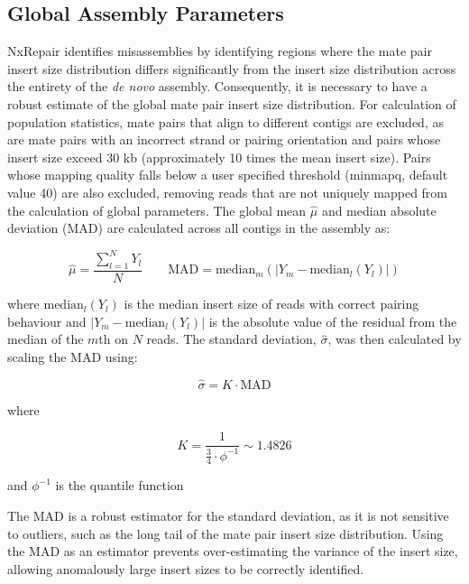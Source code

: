 \subsection{Global Assembly Parameters}
NxRepair identifies misassemblies by identifying regions where the mate pair insert size distribution differs significantly from the insert size distribution across the entirety of the \textit{de novo} assembly. Consequently, it is necessary to have a robust estimate of the global mate pair insert size distribution. For calculation of population statistics, mate pairs that align to different contigs are excluded, as are mate pairs with an incorrect strand or pairing orientation and pairs whose insert size exceed 30 kb (approximately 10 times the mean insert size). Pairs whose mapping quality falls below a user specified threshold (minmapq, default value 40) are also excluded, removing reads that are not uniquely mapped from the calculation of global parameters. The global mean $\hat{\mu}$ and median absolute deviation ($\text{MAD}$) are calculated across all contigs in the assembly as:

\begin{equation}
\hat{\mu} = \frac{\sum_{l=1}^N Y_l}{N} \qquad \text{MAD} = \text{median}_m(|Y_m - \text{median}_l(Y_l)|)
\label{eq:global}
\end{equation}

where $\text{median}_l(Y_l)$ is the median insert size of reads with correct pairing behaviour and $|Y_m - \text{median}_l(Y_l)|$ is the absolute value of the residual from the median of the $m$th on $N$ reads. The standard deviation, $\hat{\sigma}$, was then calculated by scaling the MAD using:

\begin{equation}
\hat{\sigma} = K \cdot \text{MAD}
\label{eq:mad_to_sigma}
\end{equation}

where 

\begin{equation}
K = \frac{1}{\frac{3}{4} \cdot \phi^{-1}} \sim 1.4826
\label{eq:k_scale}
\end{equation}

and $\phi^{-1}$ is the quantile function~\cite{Leys2013}

The $\text{MAD}$ is a robust estimator for the standard deviation, as it is not sensitive to outliers, such as the long tail of the mate pair insert size distribution. Using the MAD as an estimator prevents over-estimating the variance of the insert size, allowing anomalously large insert sizes to be correctly identified.

